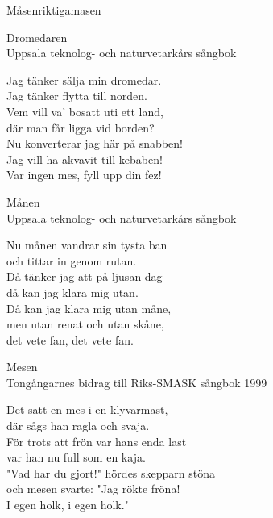 \begin{song}{Måsen}{riktigamasen}


 



{\Large Dromedaren}\\{\tiny  Uppsala teknolog- och naturvetarkårs sångbok}
  \begin{vers}
Jag tänker sälja min dromedar.\\ 
Jag tänker flytta till norden. \\
Vem vill va’ bosatt uti ett land, \\
där man får ligga vid borden? \\
Nu konverterar jag här på snabben! \\
Jag vill ha akvavit till kebaben! \\
Var ingen mes, fyll upp din fez! \\
\end{vers}
 

  {\Large Månen}\\{\tiny  Uppsala teknolog- och naturvetarkårs sångbok}
  \begin{vers}
Nu månen vandrar sin tysta ban \\
och tittar in genom rutan. \\
Då tänker jag att på ljusan dag \\
då kan jag klara mig utan. \\
Då kan jag klara mig utan måne, \\
men utan renat och utan skåne, \\
det vete fan, det vete fan. \\
\end{vers}
 

\newpage
 {\Large Mesen}\\{\tiny  Tongångarnes bidrag till Riks-SMASK sångbok 1999}
  \begin{vers}
Det satt en mes i en klyvarmast, \\
där sågs han ragla och svaja. \\
För trots att frön var hans enda last \\
var han nu full som en kaja. \\
"Vad har du gjort!" hördes skepparn stöna \\
och mesen svarte: "Jag rökte fröna! \\
I egen holk, i egen holk." \\
\end{vers}
 


\end{song}
